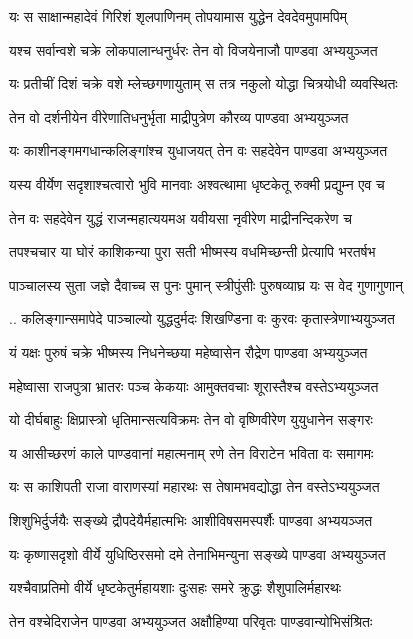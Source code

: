 \twolineshloka
{यः स साक्षान्महादेवं गिरिशं शृलपाणिनम्}
{तोपयामास युद्धेन देवदेवमुपामपिम्}


\twolineshloka
{यश्च सर्वान्वशे चक्रे लोकपालान्धनुर्धरः}
{तेन वो विजयेनाजौ पाण्डवा अभ्ययुञ्जत}


\twolineshloka
{यः प्रतीचीं दिशं चक्रे वशे म्लेच्छगणायुताम्}
{स तत्र नकुलो योद्धा चित्रयोधी व्यवस्थितः}


\twolineshloka
{तेन वो दर्शनीयेन वीरेणातिधनुर्भृता}
{माद्रीपुत्रेण कौरव्य पाण्डवा अभ्ययुञ्जत}


\twolineshloka
{यः काशीनङ्गमगधान्कलिङ्गांश्च युधाजयत्}
{तेन वः सहदेवेन पाण्डवा अभ्ययुञ्जत}


\twolineshloka
{यस्य वीर्येण सदृशाश्चत्वारो भुवि मानवाः}
{अश्वत्थामा धृष्टकेतू रुक्मी प्रद्युम्न एव च}


\twolineshloka
{तेन वः सहदेवेन युद्धं राजन्महात्ययमअ}
{यवीयसा नृवीरेण माद्रीनन्दिकरेण च}


\twolineshloka
{तपश्चचार या घोरं काशिकन्या पुरा सती}
{भीष्मस्य वधमिच्छन्ती प्रेत्यापि भरतर्षभ}


\twolineshloka
{पाञ्चालस्य सुता जज्ञे दैवाच्च स पुनः पुमान्}
{स्त्रीपुंसीः पुरुषव्याघ्र यः स वेद गुणागुणान्}


\twolineshloka
{.. कलिङ्गान्समापेदे पाञ्चाल्यो युद्धदुर्मदः}
{शिखण्डिना वः कुरवः कृतास्त्रेणाभ्ययुञ्जत}


\twolineshloka
{यं यक्षः पुरुषं चक्रे भीष्मस्य निधनेच्छया}
{महेष्वासेन रौद्रेण पाण्डवा अभ्ययुञ्जत}


\twolineshloka
{महेष्वासा राजपुत्रा भ्रातरः पञ्च केकयाः}
{आमुक्तवचाः शूरास्तैश्च वस्तेऽभ्ययुञ्जत}


\twolineshloka
{यो दीर्घबाहुः क्षिप्रास्त्रो धृतिमान्सत्यविक्रमः}
{तेन वो वृष्णिवीरेण युयुधानेन सङ्गरः}


\twolineshloka
{य आसीच्छरणं काले पाण्डवानां महात्मनाम्}
{रणे तेन विराटेन भविता वः समागमः}


\twolineshloka
{यः स काशिपती राजा वाराणस्यां महारथः}
{स तेषामभवद्योद्धा तेन वस्तेऽभ्ययुञ्जत}


\twolineshloka
{शिशुभिर्दुर्जयैः सङ्ख्ये द्रौपदेयैर्महात्मभिः}
{आशीविषसमस्पर्शैः पाण्डवा अभ्ययञ्जत}


\twolineshloka
{यः कृष्णासदृशो वीर्ये युधिष्ठिरसमो दमे}
{तेनाभिमन्युना सङ्ख्ये पाण्डवा अभ्ययुञ्जत}


\twolineshloka
{यश्चैवाप्रतिमो वीर्ये धृष्टकेतुर्महायशाः}
{दुःसहः समरे क्रुद्धः शैशुपालिर्महारथः}


\twolineshloka
{तेन वश्चेदिराजेन पाण्डवा अभ्ययुञ्जत}
{अक्षौहिण्या परिवृतः पाण्डवान्योभिसंश्रितः}


